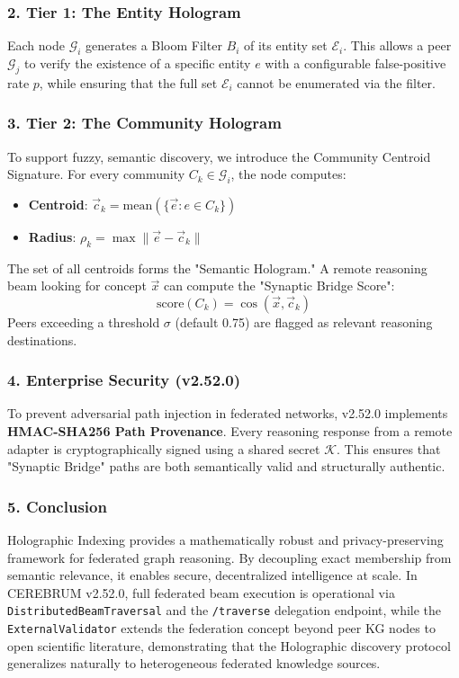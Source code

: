 \subsubsection{2. Tier 1: The Entity Hologram}
Each node $\mathcal{G}_i$ generates a Bloom Filter $B_i$ of its entity set $\mathcal{E}_i$. This allows a peer $\mathcal{G}_j$ to verify the existence of a specific entity $e$ with a confi\-gurable false-positive rate $p$, while ensuring that the full set $\mathcal{E}_i$ cannot be enumerated via the filter.

\subsubsection{3. Tier 2: The Community Hologram}
To support fuzzy, semantic discovery, we introduce the Community Centroid Signature. For every community $C_k \in \mathcal{G}_i$, the node computes:
\begin{itemize}
\item \textbf{Centroid}: $\vec{c}_k = \text{mean}(\{\vec{e} : e \in C_k\})$
\item \textbf{Radius}: $\rho_k = \max \|\vec{e} - \vec{c}_k\|$

\end{itemize}
The set of all centroids forms the "Semantic Hologram." A remote reasoning beam looking for concept $\vec{x}$ can compute the "Synaptic Bridge Score":
\begin{equation}
\text{score}(C_k) = \cos(\vec{x}, \vec{c}_k)
\end{equation}
Peers exceeding a threshold $\sigma$ (default 0.75) are flagged as relevant reasoning desti\-nations.

\subsubsection{4. Enterprise Security (v2.52.0)}
To prevent adversarial path injection in federated networks, v2.52.0 implements \textbf{HMAC-SHA256 Path Provenance}. Every reasoning response from a remote adapter is crypt\-ographically signed using a shared secret $\mathcal{K}$. This ensures that "Synaptic Bridge" paths are both seman\-tically valid and struc\-turally authentic.

\subsubsection{5. Conclusion}
Holographic Indexing provides a mathe\-matically robust and privacy-preserving framework for federated graph reasoning. By decoupling exact membership from semantic relevance, it enables secure, decen\-tralized intel\-ligence at scale. In CEREBRUM v2.52.0, full federated beam execution is operational via \texttt{DistributedBeamTraversal} and the \texttt{/traverse} delegation endpoint, while the \texttt{ExternalValidator} extends the federation concept beyond peer KG nodes to open scientific literature, demon\-strating that the Holographic discovery protocol generalizes naturally to heter\-ogeneous federated knowledge sources.

